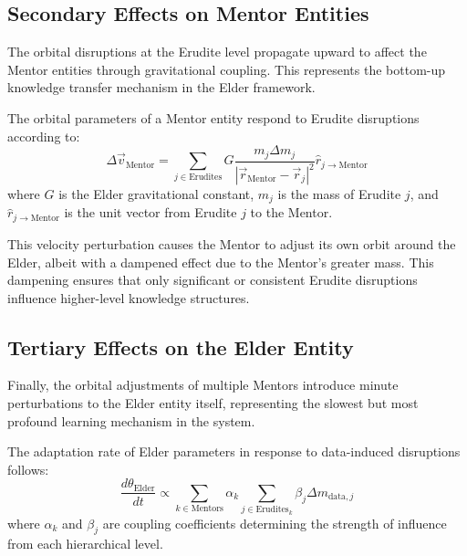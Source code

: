 \subsection{Secondary Effects on Mentor Entities}

The orbital disruptions at the Erudite level propagate upward to affect the Mentor entities through gravitational coupling. This represents the bottom-up knowledge transfer mechanism in the Elder framework.

\begin{proposition}
The orbital parameters of a Mentor entity respond to Erudite disruptions according to:
\begin{equation}
\Delta \vec{v}_{\text{Mentor}} = \sum_{j \in \text{Erudites}} G \frac{m_j \Delta m_j}{|\vec{r}_{\text{Mentor}} - \vec{r}_j|^2} \hat{r}_{j \to \text{Mentor}}
\end{equation}
where $G$ is the Elder gravitational constant, $m_j$ is the mass of Erudite $j$, and $\hat{r}_{j \to \text{Mentor}}$ is the unit vector from Erudite $j$ to the Mentor.
\end{proposition}

This velocity perturbation causes the Mentor to adjust its own orbit around the Elder, albeit with a dampened effect due to the Mentor's greater mass. This dampening ensures that only significant or consistent Erudite disruptions influence higher-level knowledge structures.

\subsection{Tertiary Effects on the Elder Entity}

Finally, the orbital adjustments of multiple Mentors introduce minute perturbations to the Elder entity itself, representing the slowest but most profound learning mechanism in the system.

\begin{theorem}
The adaptation rate of Elder parameters in response to data-induced disruptions follows:
\begin{equation}
\frac{d\theta_{\text{Elder}}}{dt} \propto \sum_{k \in \text{Mentors}} \alpha_k \sum_{j \in \text{Erudites}_k} \beta_j \Delta m_{\text{data},j}
\end{equation}
where $\alpha_k$ and $\beta_j$ are coupling coefficients determining the strength of influence from each hierarchical level.
\end{theorem}


